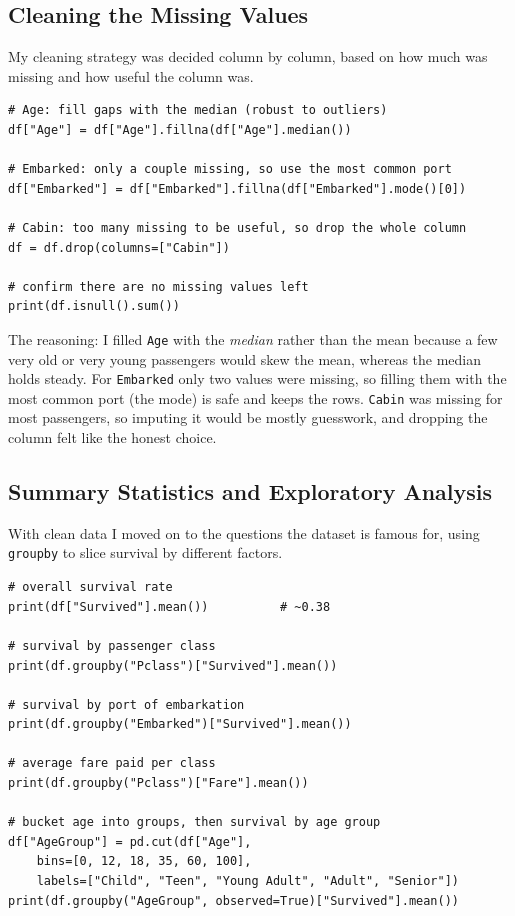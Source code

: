 \documentclass[11pt,a4paper]{article}
\begin{document}
\subsection*{Cleaning the Missing Values}
My cleaning strategy was decided column by column, based on how much was missing and how useful the column was.

\begin{lstlisting}[style=py, caption={Handling the missing values.}]
# Age: fill gaps with the median (robust to outliers)
df["Age"] = df["Age"].fillna(df["Age"].median())

# Embarked: only a couple missing, so use the most common port
df["Embarked"] = df["Embarked"].fillna(df["Embarked"].mode()[0])

# Cabin: too many missing to be useful, so drop the whole column
df = df.drop(columns=["Cabin"])

# confirm there are no missing values left
print(df.isnull().sum())
\end{lstlisting}

The reasoning: I filled \texttt{Age} with the \emph{median} rather than the mean because a few very old or very young passengers would skew the mean, whereas the median holds steady. For \texttt{Embarked} only two values were missing, so filling them with the most common port (the mode) is safe and keeps the rows. \texttt{Cabin} was missing for most passengers, so imputing it would be mostly guesswork, and dropping the column felt like the honest choice.

\subsection*{Summary Statistics and Exploratory Analysis}
With clean data I moved on to the questions the dataset is famous for, using \texttt{groupby} to slice survival by different factors.

\begin{lstlisting}[style=py, caption={Exploratory analysis with groupby.}]
# overall survival rate
print(df["Survived"].mean())          # ~0.38

# survival by passenger class
print(df.groupby("Pclass")["Survived"].mean())

# survival by port of embarkation
print(df.groupby("Embarked")["Survived"].mean())

# average fare paid per class
print(df.groupby("Pclass")["Fare"].mean())

# bucket age into groups, then survival by age group
df["AgeGroup"] = pd.cut(df["Age"],
    bins=[0, 12, 18, 35, 60, 100],
    labels=["Child", "Teen", "Young Adult", "Adult", "Senior"])
print(df.groupby("AgeGroup", observed=True)["Survived"].mean())
\end{lstlisting}
\end{document}
